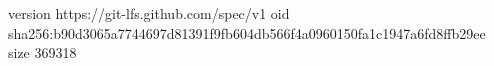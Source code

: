 version https://git-lfs.github.com/spec/v1
oid sha256:b90d3065a7744697d81391f9fb604db566f4a0960150fa1c1947a6fd8ffb29ee
size 369318
